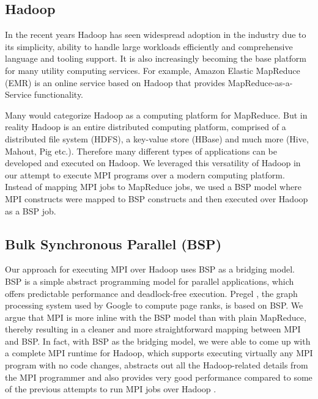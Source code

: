 \documentclass[conference,10pt] {IEEEtran}
\begin{document}
\subsection{Hadoop}
In the recent years Hadoop has seen widespread adoption in the industry due to its simplicity, ability to handle large workloads efficiently and comprehensive language and tooling support. It is also increasingly becoming the base platform for many utility computing services. For example, Amazon Elastic MapReduce (EMR) \cite{url:emr} is an online service based on Hadoop that provides MapReduce-as-a-Service functionality.

Many would categorize Hadoop as a computing platform for MapReduce. But in reality Hadoop is an entire distributed computing platform, comprised of a distributed file system (HDFS), a key-value store (HBase) and much more (Hive, Mahout, Pig etc.). Therefore many different types of applications can be developed and executed on Hadoop. We leveraged this versatility of Hadoop in our attempt to execute MPI programs over a modern computing platform. Instead of mapping MPI jobs to MapReduce jobs, we used a BSP model where MPI constructs were mapped to BSP constructs and then executed over Hadoop as a BSP job.

\subsection{Bulk Synchronous Parallel (BSP)}
Our approach for executing MPI over Hadoop uses BSP as a bridging model. BSP is a simple abstract programming model for parallel applications, which offers predictable performance and deadlock-free execution. Pregel \cite{Malewicz:2010:PSL:1807167.1807184}, the graph processing system used by Google to compute page ranks, is based on BSP. We argue that MPI is more inline with the BSP model than with plain MapReduce, thereby resulting in a cleaner and more straightforward mapping between MPI and BSP. In fact, with BSP as the bridging model, we were able to come up with a complete MPI runtime for Hadoop, which supports executing virtually any MPI program with no code changes, abstracts out all the Hadoop-related details from the MPI programmer and also provides very good performance compared to some of the previous attempts to run MPI jobs over Hadoop \cite{SS12}.
\end{document}
